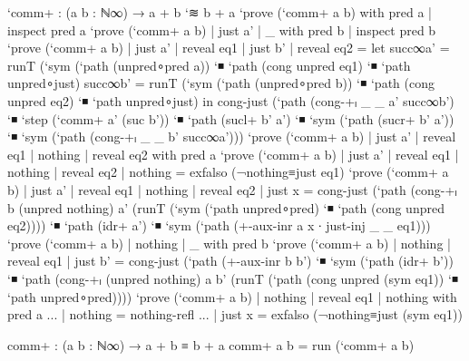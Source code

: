 \begin{code}
`comm+ : (a b : ℕ∞) → a + b `≋ b + a
`prove (`comm+ a b) with pred a | inspect pred a
`prove (`comm+ a b) | just a' | _ with pred b | inspect pred b
`prove (`comm+ a b) | just a' | reveal eq1 | just b' | reveal eq2 =
  let succ∞a' = runT (`sym (`path (unpred∘pred {a})) `◾ `path (cong unpred eq1) `◾ `path unpred∘just)
      succ∞b' = runT (`sym (`path (unpred∘pred {b})) `◾ `path (cong unpred eq2) `◾ `path unpred∘just)
  in cong-just (`path (cong-+ₗ _ _ a' succ∞b')
 `◾ `step (`comm+ a' (suc b'))
 `◾ `path (sucl+ b' a')
 `◾ `sym (`path (sucr+ b' a'))
 `◾ `sym (`path (cong-+ₗ _ _ b' succ∞a')))
`prove (`comm+ a b) | just a' | reveal eq1 | nothing | reveal eq2 with pred a
`prove (`comm+ a b) | just a' | reveal eq1 | nothing | reveal eq2 | nothing = exfalso (¬nothing≡just eq1)
`prove (`comm+ a b) | just a' | reveal eq1 | nothing | reveal eq2 | just x = cong-just
  (`path (cong-+ₗ b (unpred nothing) a' (runT (`sym (`path unpred∘pred) `◾ `path (cong unpred eq2))))
  `◾ `path (idr+ a')
  `◾ `sym (`path (+-aux-inr a x ∙ just-inj _ _ eq1)))
`prove (`comm+ a b) | nothing | _ with pred b
`prove (`comm+ a b) | nothing | reveal eq1 | just b' = cong-just (`path (+-aux-inr b b')
                                               `◾ `sym (`path (idr+ b'))
                                               `◾ `path (cong-+ₗ (unpred nothing) a b' (runT (`path (cong unpred (sym eq1)) `◾ `path unpred∘pred))))
`prove (`comm+ a b) | nothing | reveal eq1 | nothing with pred a
... | nothing = nothing-refl
... | just x = exfalso (¬nothing≡just (sym eq1))

comm+ : (a b : ℕ∞) → a + b ≡ b + a
comm+ a b = run (`comm+ a b)
\end{code}
